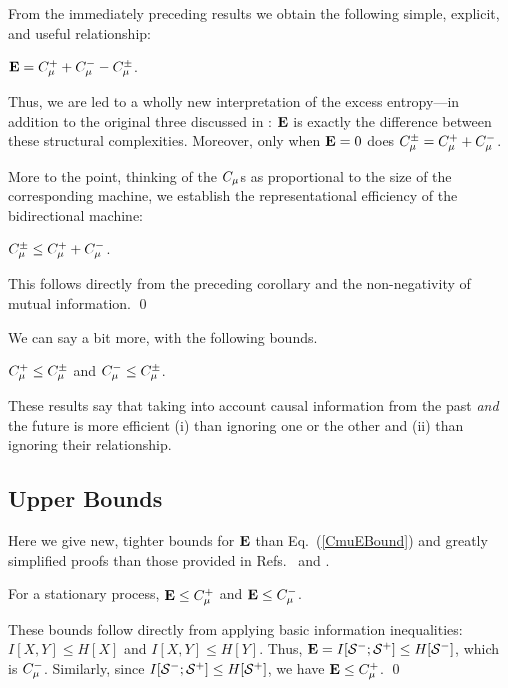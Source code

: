 From the immediately preceding results we obtain the following simple,
explicit, and useful relationship:
\begin{Cor}
${\bf E} = C_\mu^{+} + C_\mu^{-} - C_\mu^{\pm}$.
\end{Cor}

Thus, we are led to a wholly new interpretation of the excess entropy---in
addition to the original three discussed in : ${\bf E}$ is
exactly the difference between these structural complexities. Moreover,
only when \mbox{${\bf E} = 0$} does $C_\mu^{\pm} = C_\mu^{+} + C_\mu^{-}$.

More to the point, thinking of the $C_\mu$s as proportional to the size of the
corresponding machine, we establish the representational efficiency of the
bidirectional machine:
\begin{Prop}
$C_\mu^{\pm} \leq C_\mu^{+} + C_\mu^{-}$.
\end{Prop}

\begin{ProProp}
This follows directly from the preceding corollary and the non-negativity of
mutual information.
\qed
\end{ProProp}

We can say a bit more, with the following bounds.

\begin{Cor}
$C_\mu^{+} \leq C_\mu^{\pm}$ and $C_\mu^{-} \leq C_\mu^{\pm}$.
\end{Cor}

These results say that taking into account causal information from the
past \emph{and} the future is more efficient (i) than ignoring one or the
other and (ii) than ignoring their relationship.

\subsection{Upper Bounds}

Here we give new, tighter bounds for ${\bf E}$ than Eq.~(\ref{CmuEBound}) and
greatly simplified proofs than those provided in Refs.~\cite{Crut98d} and
\cite{Shal98a}.

\begin{Prop}
For a stationary process, ${\bf E} \leq C_\mu^{+}$ and ${\bf E} \leq C_\mu^{-}$.
\end{Prop}

\begin{ProProp}
These bounds follow directly from applying basic information inequalities:
$I[X,Y] \leq H[X]$ and $I[X,Y] \leq H[Y]$.
Thus, ${\bf E} = I[{\mathcal{S}}^{-};{\mathcal{S}}^{+}] \leq
H[{\mathcal{S}}^{-}]$, which is $C_\mu^{-}$. Similarly, since
$I[{\mathcal{S}}^{-};{\mathcal{S}}^{+}] \leq 
H[{\mathcal{S}}^{+}]$, we have ${\bf E} \leq C_\mu^{+}$.
\qed
\end{ProProp}

